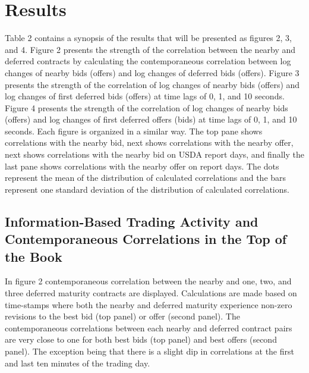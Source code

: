 \documentclass[]{elsarticle} %
\begin{document}
\section{Results}\label{results}

Table 2 contains a synopsis of the results that will be presented as
figures 2, 3, and 4. Figure 2 presents the strength of the correlation
between the nearby and deferred contracts by calculating the
contemporaneous correlation between log changes of nearby bids (offers)
and log changes of deferred bids (offers). Figure 3 presents the
strength of the correlation of log changes of nearby bids (offers) and
log changes of first deferred bids (offers) at time lags of 0, 1, and 10
seconds. Figure 4 presents the strength of the correlation of log
changes of nearby bids (offers) and log changes of first deferred offers
(bids) at time lags of 0, 1, and 10 seconds. Each figure is organized in
a similar way. The top pane shows correlations with the nearby bid, next
shows correlations with the nearby offer, next shows correlations with
the nearby bid on USDA report days, and finally the last pane shows
correlations with the nearby offer on report days. The dots represent
the mean of the distribution of calculated correlations and the bars
represent one standard deviation of the distribution of calculated
correlations.

\subsection{Information-Based Trading Activity and Contemporaneous
Correlations in the Top of the
Book}\label{information-based-trading-activity-and-contemporaneous-correlations-in-the-top-of-the-book-1}

In figure 2 contemporaneous correlation between the nearby and one, two,
and three deferred maturity contracts are displayed. Calculations are
made based on time-stamps where both the nearby and deferred maturity
experience non-zero revisions to the best bid (top panel) or offer
(second panel). The contemporaneous correlations between each nearby and
deferred contract pairs are very close to one for both best bids (top
panel) and best offers (second panel). The exception being that there is
a slight dip in correlations at the first and last ten minutes of the
trading day.
\end{document}
